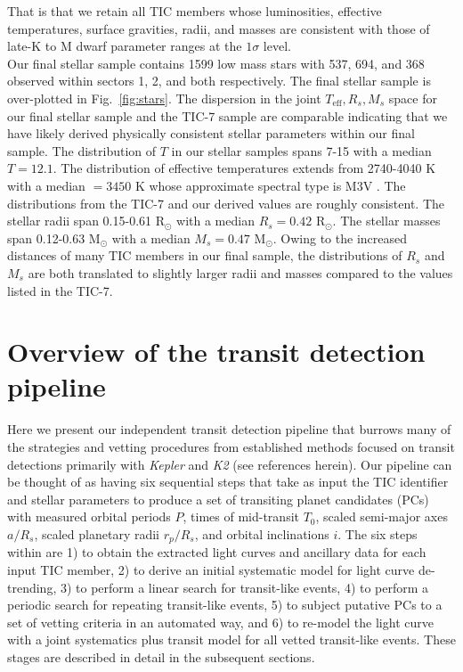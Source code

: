 \noindent That is that we retain all TIC members whose luminosities, effective temperatures, surface
gravities, radii, and masses are consistent with those of late-K to M dwarf parameter ranges
\citep{pecaut13} at the $1\sigma$ level. \\

Our final stellar sample contains 1599 low mass stars with 537, 694, and 368
observed within \tess{} sectors 1, 2, and both respectively.
The final stellar sample is over-plotted in Fig.~\ref{fig:stars}.
The dispersion in the joint $T_{\text{eff}},R_s,M_s$ space for our final stellar sample and the
TIC-7 sample are comparable indicating that we have likely derived physically consistent stellar
parameters within our final sample. The distribution of $T$
in our stellar samples spans 7-15 with a median $T=12.1$. The distribution of
effective temperatures extends from 2740-4040 K with a median \teff{} $=3450$ K
whose approximate spectral type is M3V \citep{pecaut13}. The \teff{} distributions from the TIC-7 and
our \gaia{-}derived values are roughly consistent. The stellar radii span 0.15-0.61 R$_{\odot}$
with a median $R_s=0.42$ R$_{\odot}$. The stellar masses span 0.12-0.63 M$_{\odot}$
with a median $M_s=0.47$ M$_{\odot}$. Owing to the increased distances of many TIC members in our final sample,
the distributions of $R_s$ and $M_s$ are both translated to slightly larger radii and masses compared
to the values listed in the TIC-7.


\section{Overview of the \pipeline{} transit detection pipeline} \label{sect:pipe}
Here we present our independent transit detection pipeline \pipeline{} that burrows many of the strategies and
vetting procedures from established methods focused on transit detections primarily with \emph{Kepler} and
\emph{K2} (see references herein).
Our pipeline can be thought of as having six sequential steps that
take as input the TIC identifier and stellar parameters to 
produce a set of transiting planet candidates (PCs) with measured orbital periods $P$, times of mid-transit
$T_0$, scaled semi-major axes $a/R_s$, scaled planetary radii $r_p/R_s$, and orbital inclinations $i$.
The six steps within \pipeline{} are 1) to obtain the extracted \tess{} light curves and ancillary data for
each input TIC member, 2) to derive an initial systematic model for light curve de-trending, 3) to perform a linear search
for transit-like events, 4) to perform a periodic search for repeating transit-like events, 5) to subject putative
PCs to a set of vetting criteria in an automated way, and 6) to re-model the light curve with a joint
systematics plus transit model for all vetted transit-like events. These stages are described
in detail in the subsequent sections.


